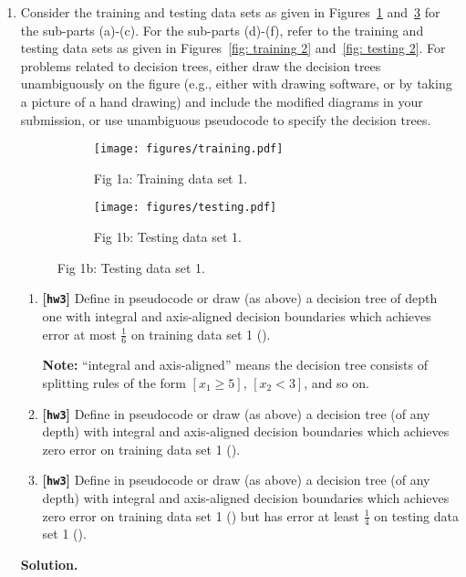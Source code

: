 \documentclass{article}
\def\hw{\textbf{[\texttt{hw3}]}\xspace}
\theoremstyle{definition}
\theoremstyle{remark}
\newenvironment{Q}
{%
\clearpage
\item
}
{%
\phantom{s} %
\bigskip
\textbf{Solution.}
}
\begin{document}
\begin{enumerate}[font={\Large\bfseries},left=0pt]
\begin{Q}
 
              Consider the training and testing data sets as given in Figures~\ref{fig: training 1} and~\ref{fig: testing 1} for the sub-parts (a)-(c). For the sub-parts (d)-(f), refer to the training and testing data sets as given in Figures~\ref{fig: training 2} and~\ref{fig: testing 2}. For problems related to decision trees, either draw the decision trees unambiguously on the figure (e.g., either with drawing software, or by taking a picture of a hand drawing) and include the modified diagrams in your submission, or use unambiguous pseudocode to specify the decision trees.
              \begin{figure}[h]
                \centering
                \begin{subfigure}{0.49\columnwidth}
                \centering
                \texttt{[image: figures/training.pdf]}
                \caption{Fig 1a: Training data set 1.}
                \label{fig: training 1}
                \end{subfigure}
                \begin{subfigure}{0.49\columnwidth}
                \centering
                \texttt{[image: figures/testing.pdf]}
                \caption{Fig 1b: Testing data set 1.}
                \label{fig: testing 1}
                \end{subfigure}
                \end{figure}
            \begin{enumerate}
              \item \hw Define in pseudocode or draw (as above) a decision tree of depth one with integral
                and axis-aligned decision boundaries
                which achieves error at most $\frac 1 6$ on training data set 1 ().

                \textbf{Note:} ``integral and axis-aligned'' means the decision tree 
                consists of splitting rules of the form $[x_1 \geq 5]$, $[x_2<3]$, and so on.

              \item \hw Define in pseudocode or draw (as above) a decision tree (of any depth) with integral
                and axis-aligned decision boundaries
                which achieves zero error on training data set 1 ().

              \item \hw Define in pseudocode or draw (as above) a decision tree (of any depth) with integral
                and axis-aligned decision boundaries
                which achieves zero error on training data set 1 ()
                but has error at least $\frac 1 4$ on 
                testing data set 1 ().


\end{enumerate}
\end{Q}
\end{enumerate}
\end{document}
